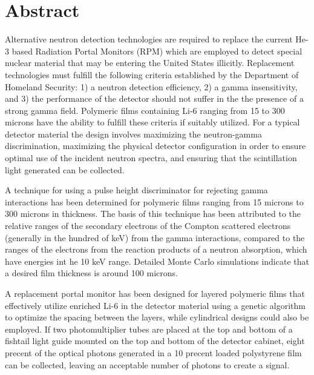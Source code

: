 \chapter*{Abstract}
\label{chap:abstract}
Alternative neutron detection technologies are required to replace the current He-3 based Radiation Portal Monitors (RPM) which are employed to detect special nuclear material that may be entering the United States illicitly.
Replacement technologies must fulfill the following criteria established by the Department of Homeland Security: 1) a neutron detection efficiency, 2) a gamma insensitivity, and 3) the performance of the detector should not suffer in the the presence of a strong gamma field.
Polymeric films containing Li-6 ranging from 15 to 300 microns have the ability to fulfill these criteria if suitably utilized.
For a typical detector material the design involves maximizing the neutron-gamma discrimination, maximizing the physical detector configuration in order to ensure optimal use of the incident neutron spectra, and ensuring that the scintillation light generated can be collected.

A technique for using a pulse height discriminator for rejecting gamma interactions has been determined for polymeric films  ranging from 15 microns to 300 microns in thickness.
The basis of this technique has been attributed to the relative ranges of the secondary electrons of the Compton scattered electrons (generally in the hundred of keV) from the gamma interactions, compared to the ranges of the electrons from the reaction products of a neutron absorption, which have energies int he 10 keV range.
Detailed Monte Carlo simulations indicate that a desired film thickness is around 100 microns.

A replacement portal monitor has been designed for layered polymeric films that effectively utilize enriched Li-6 in the detector material using a genetic algorithm to optimize the spacing between the layers, while cylindrical designs could also be employed.
If two photomultiplier tubes are placed at the top and bottom of a fishtail light guide mounted on the top and bottom of the detector cabinet, eight precent of the optical photons generated in a 10 precent loaded polystyrene film can be collected, leaving an acceptable number of photons to create a signal.
